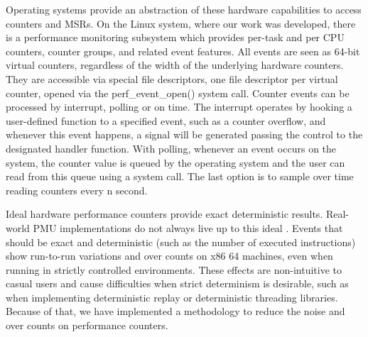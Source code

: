 
Operating systems provide an abstraction of these hardware capabilities to access counters and MSRs. 
On the Linux system, where our work was developed, there is a performance monitoring subsystem which provides per-task and per CPU counters, counter groups, and related event features. 
All events are seen as 64-bit virtual counters, regardless of the width of the underlying hardware counters. 
They are accessible via special file descriptors, one file descriptor per virtual counter, opened via the perf\_event\_open() system call.  %
Counter events can be processed by interrupt, polling or on time. The interrupt operates by hooking a user-defined function to a specified event, such as a counter overflow, and whenever this event happens, a signal will be generated passing the control to the designated handler function. With polling, whenever an event occurs on the system, the counter value is queued by the operating system and the user can read from this queue using a system call. The last option is to sample over time reading counters every n second.

Ideal hardware performance counters provide exact deterministic results. Real-world PMU implementations do not always live up to this ideal \cite{Weaver2008, Weaver2013a, Das2019SoK:Security, McGuire2009}. Events that should be exact and deterministic (such as the number of executed instructions) show run-to-run variations and over counts on x86 64 machines, even when running in strictly controlled environments. 
These effects are non-intuitive to casual users and cause difficulties when strict determinism is desirable, such as when implementing deterministic replay or deterministic threading libraries. 
Because of that, we have implemented a methodology to reduce the noise and over counts on performance counters.


